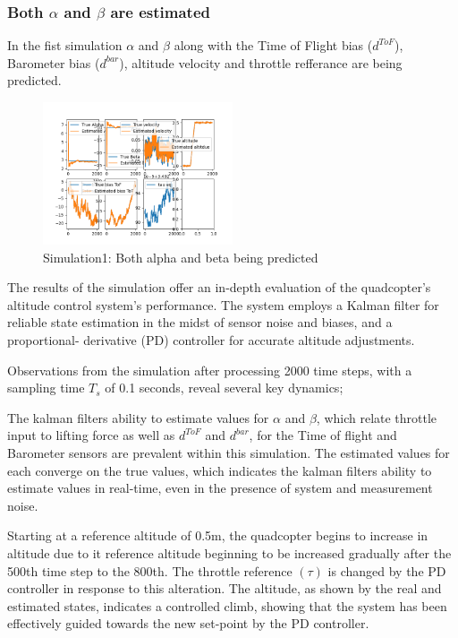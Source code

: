 \documentclass{article}
\begin{document}
\subsubsection*{Both \(\alpha\) and \(\beta\) are estimated}
In the fist simulation \(\alpha\) and \(\beta\) along with the Time of Flight bias (\(d^{ToF}\)), Barometer bias (\(d^{bar}\)), altitude velocity and throttle refferance are being predicted.
\begin{figure}[H]
  \centering
  \includegraphics[width=0.5\textwidth]{Pictures/no_constant_PD.png}
  \caption{Simulation1: Both alpha and beta being predicted}
  \label{fig:no_constant_PD}
\end{figure}
The results of the simulation offer an in-depth evaluation of the quadcopter's altitude control system's performance. The system employs a Kalman filter for reliable state estimation in the midst of sensor noise and biases, and a proportional- derivative (PD) controller for accurate altitude adjustments.

Observations from the simulation after processing 2000 time steps, with a sampling time \(T_s\) of 0.1 seconds, reveal several key dynamics;

The kalman filters ability to estimate values for \(\alpha\) and \(\beta\), which relate throttle input to lifting force as well as \(d^{ToF}\) and \(d^{bar}\), for the Time of flight and Barometer sensors are prevalent within this simulation. The estimated values for each converge on the true values, which indicates the kalman filters
ability to estimate values in real-time, even in the presence of system and measurement noise.

Starting at a reference altitude of 0.5m, the quadcopter begins to increase in altitude due to it reference altitude beginning to be increased gradually after the 500th time step to the 800th. The throttle reference \((\tau)\) is changed by the PD controller in response to this alteration. The altitude, as shown by the real 
and estimated states, indicates a controlled climb, showing that the system has been effectively guided towards the new set-point by the PD controller.
\end{document}
